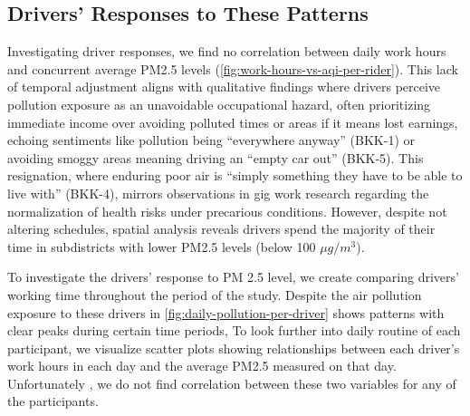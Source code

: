 \subsection{Drivers' Responses to These Patterns}
Investigating driver responses, we find no correlation between daily work hours and concurrent average PM2.5 levels
(\autoref{fig:work-hours-vs-aqi-per-rider}).
This lack of temporal adjustment aligns with qualitative findings where drivers perceive pollution exposure as an unavoidable occupational hazard, often prioritizing immediate income over avoiding polluted times or areas if it means lost earnings, echoing sentiments like pollution being ``everywhere anyway'' (BKK-1) or avoiding smoggy areas meaning driving an ``empty car out'' (BKK-5).
This resignation, where enduring poor air is ``simply something they have to be able to live with'' (BKK-4),
mirrors observations in gig work research regarding the normalization of health risks under precarious conditions.
However, despite not altering schedules, spatial analysis
reveals drivers spend the majority of their time in subdistricts with lower PM2.5 levels (below 100 $\mu g / m^3$).

To investigate the drivers' response to PM 2.5 level, we create
comparing drivers' working time throughout the period of the study.
Despite the air pollution exposure to these drivers in \autoref{fig:daily-pollution-per-driver} shows patterns with clear peaks during certain time periods,
To look further into daily routine of each participant,
we visualize scatter plots showing relationships between each driver's work hours in each day and the average PM2.5 measured on that day.
Unfortunately , we do not find correlation between these two variables for any of the participants.

